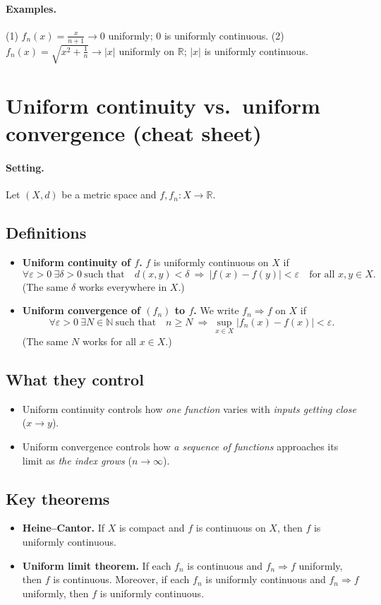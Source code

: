 \documentclass[12pt,a4paper]{article}
\begin{document}
\paragraph{Examples.}
(1) $f_n(x)=\frac{x}{n+1}\to 0$ uniformly; $0$ is uniformly continuous. \quad
(2) $f_n(x)=\sqrt{x^2+\frac1n}\to |x|$ uniformly on $\mathbb{R}$; $|x|$ is uniformly continuous.

\section*{Uniform continuity vs.\ uniform convergence (cheat sheet)}

\paragraph{Setting.} Let $(X,d)$ be a metric space and $f,f_n:X\to\mathbb{R}$.

\subsection*{Definitions}
\begin{itemize}
	\item \textbf{Uniform continuity of $f$.} 
	$f$ is uniformly continuous on $X$ if
	\[
	\forall \varepsilon>0\ \exists \delta>0\ \text{such that}\quad
	d(x,y)<\delta \ \Rightarrow\ |f(x)-f(y)|<\varepsilon
	\quad\text{for all }x,y\in X.
	\]
	(The same $\delta$ works everywhere in $X$.)
	\item \textbf{Uniform convergence of $(f_n)$ to $f$.}
	We write $f_n \Rightarrow f$ on $X$ if
	\[
	\forall \varepsilon>0\ \exists N\in\mathbb{N}\ \text{such that}\quad
	n\ge N \ \Rightarrow\ \sup_{x\in X}|f_n(x)-f(x)|<\varepsilon.
	\]
	(The same $N$ works for all $x\in X$.)
\end{itemize}

\subsection*{What they control}
\begin{itemize}
	\item Uniform continuity controls how \emph{one function} varies with \emph{inputs getting close} ($x\to y$).
	\item Uniform convergence controls how \emph{a sequence of functions} approaches its limit as \emph{the index grows} ($n\to\infty$).
\end{itemize}

\subsection*{Key theorems}
\begin{itemize}
	\item \textbf{Heine--Cantor.} If $X$ is compact and $f$ is continuous on $X$, then $f$ is uniformly continuous.
	\item \textbf{Uniform limit theorem.} If each $f_n$ is continuous and $f_n\Rightarrow f$ uniformly, then $f$ is continuous.
	Moreover, if each $f_n$ is uniformly continuous and $f_n\Rightarrow f$ uniformly, then $f$ is uniformly continuous.
\end{itemize}
\end{document}

